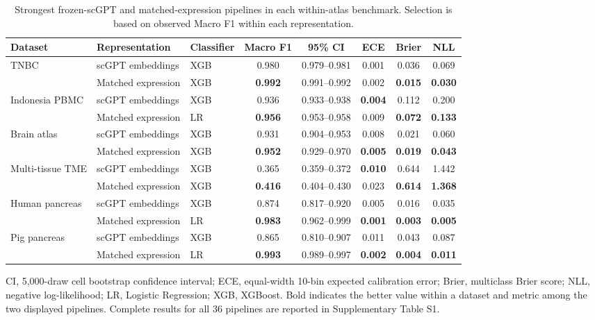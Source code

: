 \begin{table}[p]
\centering
\caption{Strongest frozen-scGPT and matched-expression pipelines in each within-atlas benchmark. Selection is based on observed Macro F1 within each representation.}
\label{tab:atlas_primary}
\scriptsize
\setlength{\tabcolsep}{3.5pt}
\begin{threeparttable}
\begin{tabular}{lllccccc}
\toprule
Dataset & Representation & Classifier & Macro F1 & 95\% CI & ECE & Brier & NLL \\
\midrule
TNBC & scGPT embeddings & XGB & 0.980 & 0.979--0.981 & 0.001 & 0.036 & 0.069 \\
 & Matched expression & XGB & \textbf{0.992} & 0.991--0.992 & 0.002 & \textbf{0.015} & \textbf{0.030} \\
Indonesia PBMC & scGPT embeddings & XGB & 0.936 & 0.933--0.938 & \textbf{0.004} & 0.112 & 0.200 \\
 & Matched expression & LR & \textbf{0.956} & 0.953--0.958 & 0.009 & \textbf{0.072} & \textbf{0.133} \\
Brain atlas & scGPT embeddings & XGB & 0.931 & 0.904--0.953 & 0.008 & 0.021 & 0.060 \\
 & Matched expression & XGB & \textbf{0.952} & 0.929--0.970 & \textbf{0.005} & \textbf{0.019} & \textbf{0.043} \\
Multi-tissue TME & scGPT embeddings & XGB & 0.365 & 0.359--0.372 & \textbf{0.010} & 0.644 & 1.442 \\
 & Matched expression & XGB & \textbf{0.416} & 0.404--0.430 & 0.023 & \textbf{0.614} & \textbf{1.368} \\
Human pancreas & scGPT embeddings & XGB & 0.874 & 0.817--0.920 & 0.005 & 0.016 & 0.035 \\
 & Matched expression & LR & \textbf{0.983} & 0.962--0.999 & \textbf{0.001} & \textbf{0.003} & \textbf{0.005} \\
Pig pancreas & scGPT embeddings & XGB & 0.865 & 0.810--0.907 & 0.011 & 0.043 & 0.087 \\
 & Matched expression & LR & \textbf{0.993} & 0.989--0.997 & \textbf{0.002} & \textbf{0.004} & \textbf{0.011} \\
\bottomrule
\end{tabular}
\begin{tablenotes}[flushleft]\scriptsize
\item CI, 5,000-draw cell bootstrap confidence interval; ECE, equal-width 10-bin expected calibration error; Brier, multiclass Brier score; NLL, negative log-likelihood; LR, Logistic Regression; XGB, XGBoost. Bold indicates the better value within a dataset and metric among the two displayed pipelines. Complete results for all 36 pipelines are reported in Supplementary Table S1.
\end{tablenotes}
\end{threeparttable}
\end{table}
